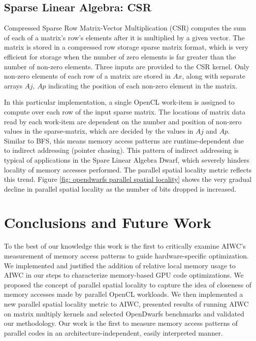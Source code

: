 \documentclass[review=false, sigchi]{acmart}
\begin{document}
	\subsection{Sparse Linear Algebra: CSR}
	
	Compressed Sparse Row Matrix-Vector Multiplication (CSR) computes the sum of each of a matrix's row's elements after it is multiplied by a given vector. The matrix is stored in a compressed row storage sparse matrix format, which is very efficient for storage when the number of zero elements is far greater than the number of non-zero elements. Three inputs are provided to the CSR kernel. Only non-zero elements of each row of a matrix are stored in $Ax$, along with separate arrays $Aj,\ Ap$ indicating the position of each non-zero element in the matrix.
	
	In this particular implementation, a single OpenCL work-item is assigned to compute over each row of the input sparse matrix. 
	The locations of matrix data read by each work-item are dependent on the number and position of non-zero values in the sparse-matrix, which are decided by the values in $Aj$ and $Ap$. 
	Similar to BFS, this means memory access patterns are runtime-dependent due to indirect addressing (pointer chasing).
	This pattern of indirect addressing is typical of applications in the Spare Linear Algebra Dwarf, which severely hinders locality of memory accesses performed. The parallel spatial locality metric reflects this trend. Figure \ref{fig: opendwarfs parallel spatial locality} shows the very gradual decline in parallel spatial locality as the number of bits dropped is increased.
	
	\section{Conclusions and Future Work} \label{future work}
	
	To the best of our knowledge this work is the first to critically examine AIWC's measurement of memory access patterns to guide hardware-specific optimization. 
	We implemented and justified the addition of relative local memory usage to AIWC in our steps to characterize memory-based GPU code optimizations.
	We proposed the concept of parallel spatial locality to capture the idea of closeness of memory accesses made by parallel OpenCL workloads.
	We then implemented a new parallel spatial locality metric to AIWC, presented results of running AIWC on matrix multiply kernels and selected OpenDwarfs benchmarks and validated our methodology. 
	Our work is the first to measure memory access patterns of parallel codes in an architecture-independent, easily interpreted manner. %
	
\end{document}
